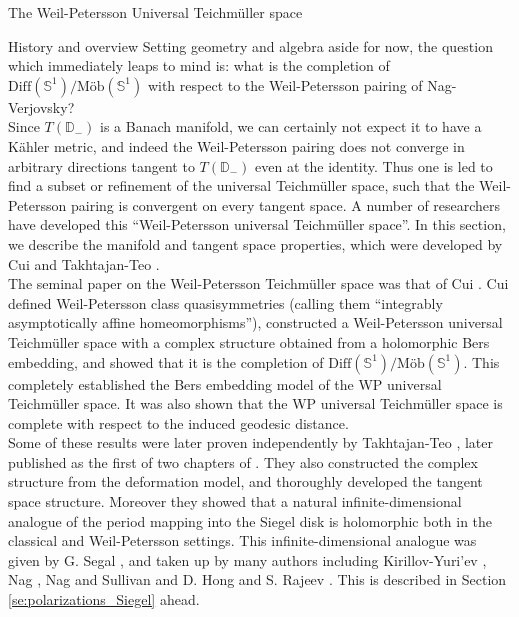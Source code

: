 \documentclass[12pt]{amsart}
\newcommand{\disk}{\ensuremath{\mathbb{D}} } %
\theoremstyle{plain}
\theoremstyle{definition}
\theoremstyle{remark}
\numberwithin{equation}{section} %
\numberwithin{figure}{section} %
\begin{document}
\begin{section}{The Weil-Petersson Universal Teichm\"uller space}
\begin{subsection}{History and overview}
  Setting geometry and algebra aside for now, the question which immediately leaps to mind is: what is the completion of $\mathrm{Diff}(\mathbb{S}^1)/\text{M\"ob}(\mathbb{S}^1)$ with respect to the Weil-Petersson pairing of Nag-Verjovsky?\\ 
  
   Since $T(\disk_-)$ is a Banach manifold, we can certainly not expect it to have a K\"ahler metric, and indeed the Weil-Petersson pairing does not converge in arbitrary directions tangent to $T(\disk_-)$ even at the identity. Thus one is led to find a subset or refinement of the universal Teichm\"uller space, such that the Weil-Petersson pairing is convergent on every tangent space. 
    A number of researchers have developed this ``Weil-Petersson universal Teichm\"uller space''.  In this section, we describe the manifold and tangent space properties, which were developed by Cui \cite{Cui} and Takhtajan-Teo \cite{Takhtajan_Teo_Memoirs}.\\

  The seminal paper on the Weil-Petersson Teichm\"uller space was that of Cui \cite{Cui}.  Cui defined Weil-Petersson class quasisymmetries (calling them ``integrably asymptotically affine homeomorphisms''), constructed a Weil-Petersson universal Teichm\"uller space with a complex structure obtained from a holomorphic Bers embedding, and showed that it is the completion of $\text{Diff}(\mathbb{S}^1)/\text{M\"ob}(\mathbb{S}^1)$. This completely established the Bers embedding model of the WP universal Teichm\"uller space.  It was also shown that the WP universal Teichm\"uller space is complete with respect to the induced geodesic distance.\\ 
  
  Some of these results were later proven independently by Takhtajan-Teo \cite{TT_arxiv_1}, later published as the first of two chapters of  \cite{Takhtajan_Teo_Memoirs}. They also constructed the complex structure from the deformation model, and thoroughly developed the tangent space structure. Moreover they showed that a natural infinite-dimensional analogue of the period mapping into the Siegel disk is holomorphic both in the classical and Weil-Petersson settings. This infinite-dimensional analogue was given by G. Segal \cite{SegalUnitary}, and taken up by many authors including Kirillov-Yuri'ev \cite{KY2}, Nag \cite{Nag_bulletin}, Nag and Sullivan \cite{NagSullivan} and D. Hong and S. Rajeev \cite{HongRajeev}. This is described in Section \ref{se:polarizations_Siegel} ahead.
  

\end{subsection}
\end{section}
\end{document}

